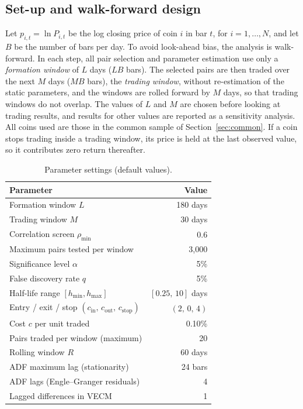 \documentclass[10pt,a4paper,twocolumn]{article}
\begin{document}
	\subsection{Set-up and walk-forward design}
	\label{sec:walk}
	Let $p_{i,t}=\ln P_{i,t}$ be the log closing price of coin $i$ in bar $t$, for $i=1,\dots,N$, and let $B$ be the number of bars per day. To avoid look-ahead bias, the analysis is walk-forward. In each step, all pair selection and parameter estimation use only a \emph{formation window} of $L$ days ($LB$ bars). The selected pairs are then traded over the next $M$ days ($MB$ bars), the \emph{trading window}, without re-estimation of the static parameters, and the windows are rolled forward by $M$ days, so that trading windows do not overlap. The values of $L$ and $M$ are chosen before looking at trading results, and results for other values are reported as a sensitivity analysis. All coins used are those in the common sample of Section~\ref{sec:common}. If a coin stops trading inside a trading window, its price is held at the last observed value, so it contributes zero return thereafter.
	
	\begin{table}[htbp]
		\centering
		\small
		\caption{Parameter settings (default values).}
		\label{tab:params}
		\begin{tabularx}{\columnwidth}{@{}Xr@{}}
			\toprule
			Parameter & Value \\
			\midrule
			Formation window $L$ & 180 days \\
			Trading window $M$ & 30 days \\
			Correlation screen $\rho_{\min}$ & 0.6 \\
			Maximum pairs tested per window & 3{,}000 \\
			Significance level $\alpha$ & 5\% \\
			False discovery rate $q$ & 5\% \\
			Half-life range $[h_{\min},h_{\max}]$ & $[0.25,\,10]$ days \\
			Entry / exit / stop $(c_{\text{in}},\,c_{\text{out}},\,c_{\text{stop}})$ & $(2,\,0,\,4)$ \\
			Cost $c$ per unit traded & 0.10\% \\
			Pairs traded per window (maximum) & 20 \\
			Rolling window $R$ & 60 days \\
			ADF maximum lag (stationarity) & 24 bars \\
			ADF lags (Engle--Granger residuals) & 4 \\
			Lagged differences in VECM & 1 \\
			\bottomrule
		\end{tabularx}
	\end{table}
	
\end{document}
